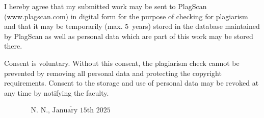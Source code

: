 \documentclass[12pt,twoside,a4paper,parskip]{scrbook} %
\def\BaAuthor{Bibin Babu}
\def\SubmitDate{January 15th 2025}
\def\ShowBaAuthor{\BaAuthor}
\def\ShowBaAuthor{N.~N.}
\begin{document}

I hereby agree that my submitted work may be sent to PlagScan (www.plagscan.com) in digital form for the purpose of checking for plagiarism and that it may be temporarily (max. 5~years) stored in the database maintained by PlagScan as well as personal data which are part of this work may be stored there.

\begin{small}
Consent is voluntary. Without this consent, the plagiarism check cannot be prevented by removing all personal data and protecting the copyright requirements. Consent to the storage and use of personal data may be revoked at any time by notifying the faculty.
\end{small}

\vspace{20pt}
\begin{flushright}
$\overline{~~~~~~~~~~~~~~~~~\mbox{\ShowBaAuthor, \SubmitDate}~~~~~~~~~~~~~~~~~}$
\end{flushright}
\end{document}

